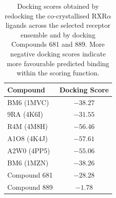 \begin{table}[htbp]
    \centering
    \small
    \caption{Docking scores obtained by redocking the co-crystallised RXR$\alpha$ ligands across the selected receptor ensemble and by docking Compounds 681 and 889. More negative docking scores indicate more favourable predicted binding within the scoring function.}
    \label{tab:rxra_redocking_scores}
    \begin{tabular}{l c}
        \hline
        \textbf{Compound} & \textbf{Docking Score} \\
        \hline
        BM6 (1MVC) & $-38.27$ \\
        9RA (4K6I) & $-31.55$ \\
        R4M (4M8H) & $-56.46$ \\
        A1O8 (4K4J) & $-57.61$ \\
        A2W0 (4PP5) & $-55.06$ \\
        BM6 (1MZN) & $-38.26$ \\
        \hline
        Compound 681 & $-28.28$ \\
        Compound 889 & $-1.78$ \\
        \hline
    \end{tabular}
\end{table}
